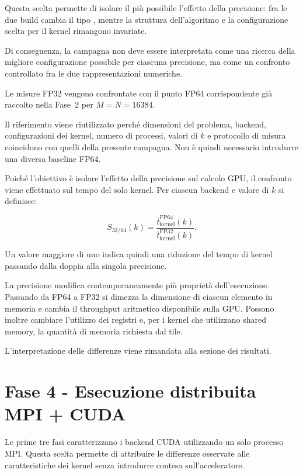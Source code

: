 Questa scelta permette di isolare il più possibile l'effetto della
precisione: fra le due build cambia il tipo , mentre la
struttura dell'algoritmo e la configurazione scelta per il kernel rimangono
invariate.

Di conseguenza, la campagna non deve essere interpretata come una ricerca
della migliore configurazione possibile per ciascuna precisione, ma come
un confronto controllato fra le due rappresentazioni numeriche.

Le misure FP32 vengono confrontate con il punto FP64 corrispondente già
raccolto nella Fase~2 per
$M=N=\num{16384}$.

Il riferimento viene riutilizzato perché dimensioni del problema, backend,
configurazioni dei kernel, numero di processi, valori di $k$ e protocollo
di misura coincidono con quelli della presente campagna. Non è quindi
necessario introdurre una diversa baseline FP64.

Poiché l'obiettivo è isolare l'effetto della precisione sul calcolo GPU,
il confronto viene effettuato sul tempo del solo kernel. Per ciascun backend
e valore di $k$ si definisce:

\begin{equation}
S_{32/64}(k)
=
\frac{
\overline{t}_{\mathrm{kernel}}^{\mathrm{FP64}}(k)
}{
\overline{t}_{\mathrm{kernel}}^{\mathrm{FP32}}(k)
}.
\label{eq:speedup-precisione}
\end{equation}

Un valore maggiore di uno indica quindi una riduzione del tempo di kernel
passando dalla doppia alla singola precisione.

La precisione modifica contemporaneamente più proprietà dell'esecuzione.
Passando da FP64 a FP32 si dimezza la dimensione di ciascun elemento in
memoria e cambia il throughput aritmetico disponibile sulla GPU. Possono
inoltre cambiare l'utilizzo dei registri e, per i kernel che utilizzano
shared memory, la quantità di memoria richiesta dal tile.

L'interpretazione delle differenze viene rimandata alla sezione dei
risultati.

\section{Fase 4 - Esecuzione distribuita MPI + CUDA}
\label{sec:fase4-mpi-cuda}

Le prime tre fasi caratterizzano i backend CUDA utilizzando un solo
processo MPI. Questa scelta permette di attribuire le differenze osservate
alle caratteristiche dei kernel senza introdurre contesa sull'acceleratore.

